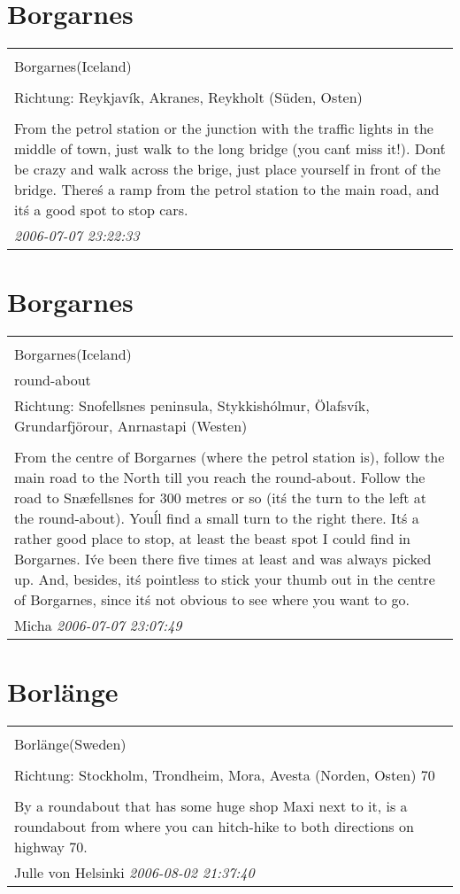 \documentclass[a4paper,12pt]{article}
\begin{document}
\section{Borgarnes}
\begin{tabular}{|p{13cm}|}
\hline\\
Borgarnes(Iceland)\\
\\
Richtung: Reykjavík, Akranes, Reykholt (Süden, Osten) \\
\hline\\
From the petrol station or the junction with the traffic lights in the middle of town, just walk to the long bridge (you can\'t miss it!). Don\'t be crazy and walk across the brige, just place yourself in front of the bridge. There\'s a ramp from the petrol station to the main road, and it\'s a good spot to stop cars. \\
\textit{ 2006-07-07 23:22:33 }\\\hline
\end{tabular}


\section{Borgarnes}
\begin{tabular}{|p{13cm}|}
\hline\\
Borgarnes(Iceland)\\
round-about\\
Richtung: Snofellsnes peninsula, Stykkishólmur, Ölafsvík, Grundarfjörour, Anrnastapi (Westen) \\
\hline\\
From the centre of Borgarnes (where the petrol station is), follow the main road to the North till you reach the round-about. Follow the road to Snæfellsnes for 300 metres or so (it\'s the turn to the left at the round-about). You\'ll find a small turn to the right there. It\'s a rather good place to stop, at least the beast spot I could find in Borgarnes. I\'ve been there five times at least and was always picked up. And, besides, it\'s pointless to stick your thumb out in the centre of Borgarnes, since it\'s not obvious to see where you want to go. \\
Micha \textit{ 2006-07-07 23:07:49 }\\\hline
\end{tabular}


\section{Borlänge}
\begin{tabular}{|p{13cm}|}
\hline\\
Borlänge(Sweden)\\
\\
Richtung: Stockholm, Trondheim, Mora, Avesta (Norden, Osten) 70 \\
\hline\\
By a roundabout that has some huge shop Maxi next to it, is a roundabout from where you can hitch-hike to both directions on highway 70. \\
Julle von Helsinki \textit{ 2006-08-02 21:37:40 }\\\hline
\end{tabular}
\end{document}
